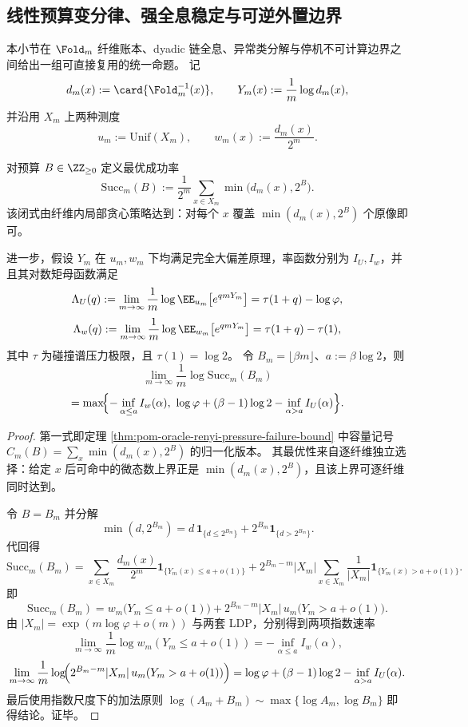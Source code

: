 \subsection{线性预算变分律、强全息稳定与可逆外置边界}\label{subsec:conclusion-fold-ledger-dual-ldp-holography-undecidability-langlands}
本小节在 \(\Fold_m\) 纤维账本、dyadic 链全息、异常类分解与停机不可计算边界之间给出一组可直接复用的统一命题。
记
\[
d_m(x):=\card{\Fold_m^{-1}(x)},\qquad
Y_m(x):=\frac1m\log d_m(x),
\]
并沿用 \(X_m\) 上两种测度
\[
u_m:=\mathrm{Unif}(X_m),\qquad
w_m(x):=\frac{d_m(x)}{2^m}.
\]

\begin{theorem}[线性比特预算下预言机成功率的双大偏差变分律]\label{thm:conclusion-oracle-success-double-ldp-variational}
对预算 \(B\in\ZZ_{\ge 0}\) 定义最优成功率
\[
\mathrm{Succ}_m(B):=\frac{1}{2^m}\sum_{x\in X_m}\min\!\bigl(d_m(x),2^B\bigr).
\]
该闭式由纤维内局部贪心策略达到：对每个 \(x\) 覆盖 \(\min(d_m(x),2^B)\) 个原像即可。

进一步，假设 \(Y_m\) 在 \(u_m,w_m\) 下均满足完全大偏差原理，率函数分别为 \(I_U,I_w\)，并且其对数矩母函数满足
\[
\Lambda_U(q):=\lim_{m\to\infty}\frac1m\log\EE_{u_m}\!\left[e^{qmY_m}\right]
=\tau(1+q)-\log\varphi,
\]
\[
\Lambda_w(q):=\lim_{m\to\infty}\frac1m\log\EE_{w_m}\!\left[e^{qmY_m}\right]
=\tau(1+q)-\tau(1),
\]
其中 \(\tau\) 为碰撞谱压力极限，且 \(\tau(1)=\log 2\)。
令 \(B_m=\lfloor \beta m\rfloor\)、\(a:=\beta\log 2\)，则
\[
\lim_{m\to\infty}\frac1m\log \mathrm{Succ}_m(B_m)
\]
\[
=
\max\!\Bigl\{
-\inf_{\alpha\le a}I_w(\alpha),\
\log\varphi+(\beta-1)\log 2-\inf_{\alpha>a}I_U(\alpha)
\Bigr\}.
\]
\end{theorem}

\begin{proof}
第一式即定理 \ref{thm:pom-oracle-renyi-pressure-failure-bound} 中容量记号
\(
C_m(B)=\sum_x\min(d_m(x),2^B)
\)
的归一化版本。
其最优性来自逐纤维独立选择：给定 \(x\) 后可命中的微态数上界正是 \(\min(d_m(x),2^B)\)，且该上界可逐纤维同时达到。

令 \(B=B_m\) 并分解
\[
\min(d,2^{B_m})=d\,\mathbf 1_{\{d\le 2^{B_m}\}}+2^{B_m}\mathbf 1_{\{d>2^{B_m}\}}.
\]
代回得
\[
\mathrm{Succ}_m(B_m)
=\sum_{x\in X_m}\frac{d_m(x)}{2^m}\mathbf 1_{\{Y_m(x)\le a+o(1)\}}
+2^{B_m-m}|X_m|
\sum_{x\in X_m}\frac{1}{|X_m|}\mathbf 1_{\{Y_m(x)>a+o(1)\}}.
\]
即
\[
\mathrm{Succ}_m(B_m)
=w_m\!\bigl(Y_m\le a+o(1)\bigr)
+2^{B_m-m}|X_m|\,u_m\!\bigl(Y_m>a+o(1)\bigr).
\]
由 \(|X_m|=\exp(m\log\varphi+o(m))\) 与两套 LDP，分别得到两项指数速率
\[
\lim_{m\to\infty}\frac1m\log w_m(Y_m\le a+o(1))
=-\inf_{\alpha\le a}I_w(\alpha),
\]
\[
\lim_{m\to\infty}\frac1m\log\!\Bigl(2^{B_m-m}|X_m|\,u_m(Y_m>a+o(1))\Bigr)
=\log\varphi+(\beta-1)\log2-\inf_{\alpha>a}I_U(\alpha).
\]
最后使用指数尺度下的加法原则
\(
\log(A_m+B_m)\sim\max\{\log A_m,\log B_m\}
\)
即得结论。证毕。
\end{proof}

